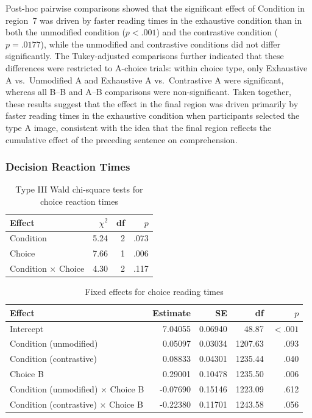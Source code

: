 \documentclass[a4paper, ruler]{CUP-JNL-LIN}%
\begin{document}
Post-hoc pairwise comparisons showed that the significant effect of Condition in region~7 was driven by faster reading times in the exhaustive condition than in both the unmodified condition ($p<.001$) and the contrastive condition ($p=.0177$), while the unmodified and contrastive conditions did not differ significantly. The Tukey-adjusted comparisons further indicated that these differences were restricted to A-choice trials: within choice type, only Exhaustive A vs.\ Unmodified A and Exhaustive A vs.\ Contrastive A were significant, whereas all B--B and A--B comparisons were non-significant. Taken together, these results suggest that the effect in the final region was driven primarily by faster reading times in the exhaustive condition when participants selected the type A image, consistent with the idea that the final region reflects the cumulative effect of the preceding sentence on comprehension.



\subsubsection{Decision Reaction Times}

\begin{table}[htbp]
\centering
\caption{Type III Wald chi-square tests for choice reaction times}
\label{tab:choice-rt}
\begin{tabularx}{\textwidth}{@{}Xrrr@{}}
\toprule
Effect & $\chi^2$ & df & $p$ \\
\midrule
Condition & 5.24 & 2 & .073 \\
Choice & 7.66 & 1 & .006 \\
Condition $\times$ Choice & 4.30 & 2 & .117 \\
\bottomrule
\end{tabularx}
\end{table}

\begin{table}[htbp]
\centering
\caption{Fixed effects for choice reading times}
\label{tab:choice-rt-fixed}
\begin{tabularx}{\textwidth}{@{}Xrrrr@{}}
\toprule
Effect & Estimate & SE & df & $p$ \\
\midrule
Intercept & 7.04055 & 0.06940 & 48.87 & $< .001$ \\
Condition (unmodified) & 0.05097 & 0.03034 & 1207.63 & .093 \\
Condition (contrastive) & 0.08833 & 0.04301 & 1235.44 & .040 \\
Choice B & 0.29001 & 0.10478 & 1235.50 & .006 \\
Condition (unmodified) $\times$ Choice B & -0.07690 & 0.15146 & 1223.09 & .612 \\
Condition (contrastive) $\times$ Choice B & -0.22380 & 0.11701 & 1243.58 & .056 \\
\bottomrule
\end{tabularx}
\end{table}
\end{document}

